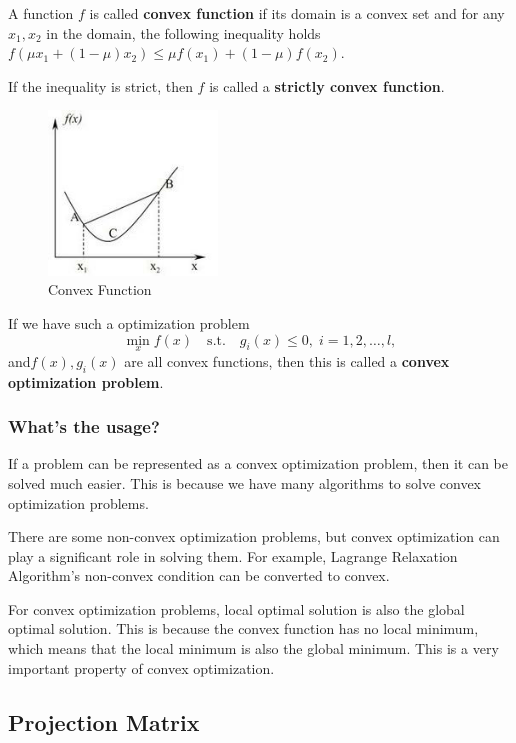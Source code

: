 \documentclass[12pt]{ctexart}
\begin{document}
A function $f$ is called \textbf{convex function} if its domain is a convex set and for any
$x_1, x_2$ in the domain, the following inequality holds $f(\mu x_1 + (1-\mu)x_2) \leq \mu
 f(x_1) + (1-\mu)f(x_2)$.


If the inequality is strict, then $f$ is called a \textbf{strictly convex function}.

\begin{figure}[H]
  \centering
  \includegraphics[width=0.4\textwidth]{assets/2.3 Convex Optimization/Convex Function.png}
  \caption{Convex Function}
\end{figure}

If we have such a optimization problem
\[
  \min_{x} f(x)
  \quad\text{s.t.}\quad
  g_i(x)\le 0,\;i=1,2,\dots,l,
\]
and$f(x), g_i(x)$ are all convex functions, then this is called a \textbf{convex
optimization problem}.

\subsubsection{\textbf{What's the usage?}}

If a problem can be represented as a convex optimization problem, then it can be solved
much easier. This is because we have many algorithms to solve convex optimization problems.

There are some non-convex optimization problems, but convex optimization can play a
significant role in solving them. For example, Lagrange Relaxation Algorithm's non-convex
condition can be converted to convex.

For convex optimization problems, local optimal solution is also the global optimal solution.
This is because the convex function has no local minimum, which means that the local minimum
is also the global minimum. This is a very important property of convex optimization.

\subsection{\textbf{Projection Matrix}}
\end{document}
